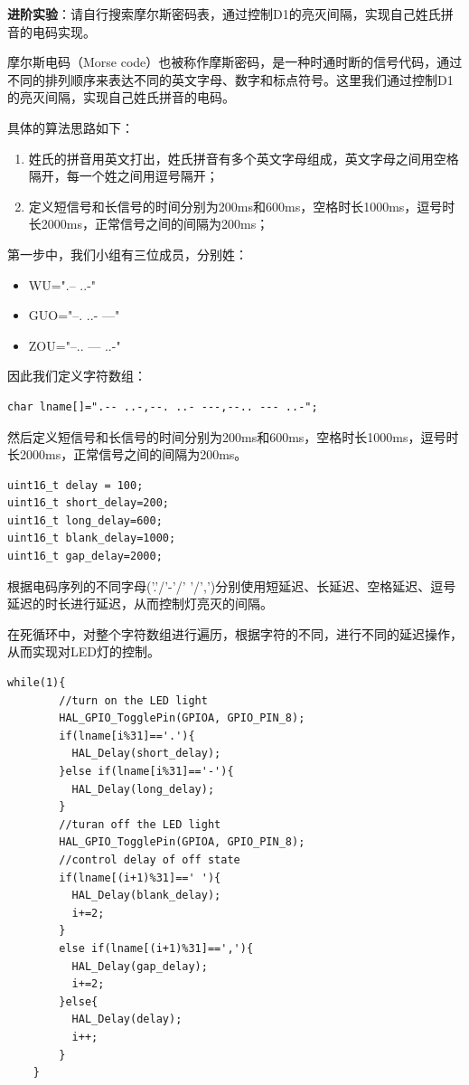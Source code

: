 ﻿\documentclass[UTF8,12pt]{article}
\begin{document}
\noindent
\textbf{进阶实验}：请自行搜索摩尔斯密码表，通过控制D1的亮灭间隔，实现自己姓氏拼音的电码实现。

摩尔斯电码（Morse code）也被称作摩斯密码，是一种时通时断的信号代码，通过不同的排列顺序来表达不同的英文字母、数字和标点符号。这里我们通过控制D1的亮灭间隔，实现自己姓氏拼音的电码。

具体的算法思路如下：

\begin{enumerate}
    \item 姓氏的拼音用英文打出，姓氏拼音有多个英文字母组成，英文字母之间用空格隔开，每一个姓之间用逗号隔开；
    \item 定义短信号和长信号的时间分别为200ms和600ms，空格时长1000ms，逗号时长2000ms，正常信号之间的间隔为200ms；
\end{enumerate}

第一步中，我们小组有三位成员，分别姓：

\begin{itemize}
    \item WU=".-- ..-"
    \item GUO="--. ..- ---"
    \item ZOU="--.. --- ..-"
\end{itemize}

因此我们定义字符数组：
\begin{lstlisting}[frame=shadowbox]
char lname[]=".-- ..-,--. ..- ---,--.. --- ..-";
\end{lstlisting}

然后定义短信号和长信号的时间分别为200ms和600ms，空格时长1000ms，逗号时长2000ms，正常信号之间的间隔为200ms。

\begin{lstlisting}[frame=shadowbox]
uint16_t delay = 100;
uint16_t short_delay=200;
uint16_t long_delay=600;
uint16_t blank_delay=1000;
uint16_t gap_delay=2000;
\end{lstlisting}

根据电码序列的不同字母('.'/'-'/' '/',')分别使用短延迟、长延迟、空格延迟、逗号延迟的时长进行延迟，从而控制灯亮灭的间隔。

在死循环中，对整个字符数组进行遍历，根据字符的不同，进行不同的延迟操作，从而实现对LED灯的控制。

\begin{lstlisting}[frame=shadowbox]
    while(1){
        //turn on the LED light
        HAL_GPIO_TogglePin(GPIOA, GPIO_PIN_8);
        if(lname[i%31]=='.'){
          HAL_Delay(short_delay);
        }else if(lname[i%31]=='-'){
          HAL_Delay(long_delay);
        }
        //turan off the LED light
        HAL_GPIO_TogglePin(GPIOA, GPIO_PIN_8);
        //control delay of off state
        if(lname[(i+1)%31]==' '){
          HAL_Delay(blank_delay);
          i+=2;
        }
        else if(lname[(i+1)%31]==','){
          HAL_Delay(gap_delay);
          i+=2;
        }else{
          HAL_Delay(delay);
          i++;
        }
    }
\end{lstlisting}
\end{document}
